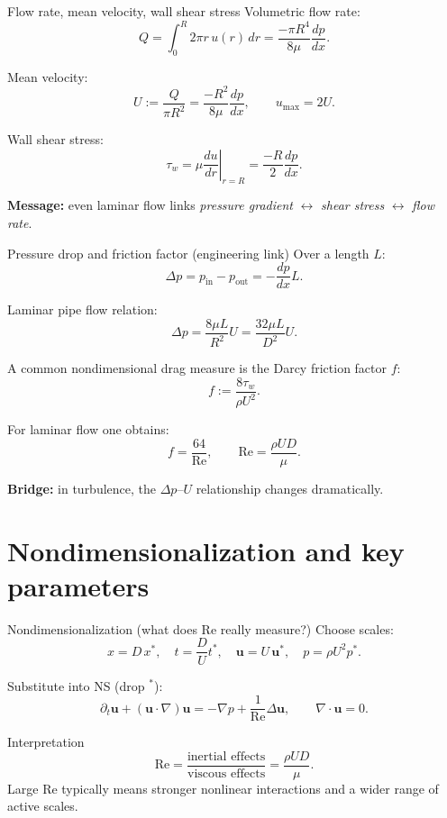 \documentclass[aspectratio=169]{beamer}
\newcommand{\uu}{\bm{u}}
\newcommand{\pp}{p}
\newcommand{\Rey}{\mathrm{Re}}
\newcommand{\grad}{\nabla}
\newcommand{\Div}{\nabla\cdot}
\newcommand{\Lap}{\Delta}
\begin{document}
\begin{frame}{Flow rate, mean velocity, wall shear stress}
Volumetric flow rate:
\[
Q = \int_0^R 2\pi r\,u(r)\,dr
= \frac{-\pi R^4}{8\mu}\frac{d\pp}{dx}.
\]

Mean velocity:
\[
U := \frac{Q}{\pi R^2} = \frac{-R^2}{8\mu}\frac{d\pp}{dx},
\qquad
u_{\max}=2U.
\]

Wall shear stress:
\[
\tau_w = \mu \left.\frac{du}{dr}\right|_{r=R}
= \frac{-R}{2}\frac{d\pp}{dx}.
\]

\textbf{Message:} even laminar flow links \emph{pressure gradient} $\leftrightarrow$ \emph{shear stress} $\leftrightarrow$ \emph{flow rate}.
\end{frame}

\begin{frame}{Pressure drop and friction factor (engineering link)}
Over a length $L$:
\[
\Delta p = p_{\text{in}}-p_{\text{out}} = -\frac{d p}{dx}L.
\]

Laminar pipe flow relation:
\[
\Delta p = \frac{8\mu L}{R^2}U = \frac{32\mu L}{D^2}U.
\]

A common nondimensional drag measure is the Darcy friction factor $f$:
\[
f := \frac{8\tau_w}{\rho U^2}.
\]

For laminar flow one obtains:
\[
f = \frac{64}{\Rey},\qquad \Rey=\frac{\rho U D}{\mu}.
\]

\textbf{Bridge:} in turbulence, the $\Delta p$--$U$ relationship changes dramatically.
\end{frame}

\section{Nondimensionalization and key parameters}

\begin{frame}{Nondimensionalization (what does Re really measure?)}
Choose scales:
\[
x = D\,x^*,\quad t=\frac{D}{U}t^*,\quad \uu = U\,\uu^*,\quad p = \rho U^2 p^*.
\]

Substitute into NS (drop $^*$):
\[
\partial_t \uu + (\uu\cdot\grad)\uu = -\grad p + \frac{1}{\Rey}\Lap\uu,\qquad \Div\uu=0.
\]

\begin{block}{Interpretation}
\[
\Rey=\frac{\text{inertial effects}}{\text{viscous effects}}=\frac{\rho U D}{\mu}.
\]
Large $\Rey$ typically means stronger nonlinear interactions and a wider range of active scales.
\end{block}
\end{frame}
\end{document}
